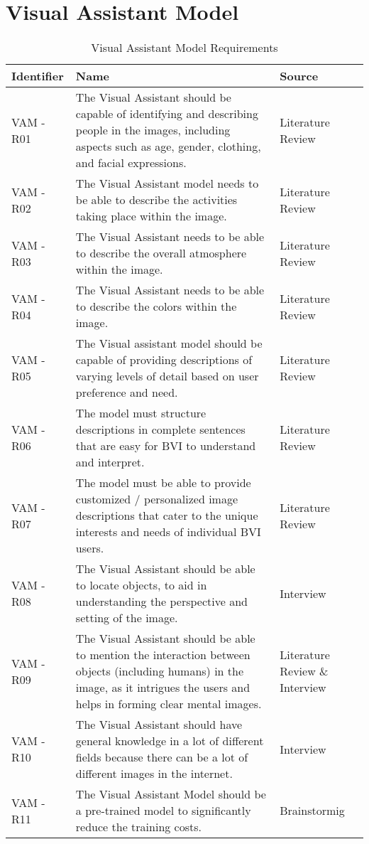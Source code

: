 \section{Visual Assistant Model}
\begin{table}[ht]
  \centering
  \caption{Visual Assistant Model Requirements}
\begin{tabularx}{\textwidth}{@{}p{2cm}p{10cm}p{3cm}@{}}
    \toprule
    \textbf{Identifier} & \textbf{Name} & \textbf{Source}\\
    \midrule

    VAM - R01 & The Visual Assistant should be capable of identifying and describing people in the images, including aspects such as age, gender, clothing, and facial expressions. & Literature Review\\
    \hline
    VAM - R02 & The Visual Assistant model needs to be able to describe the activities taking place within the image. & Literature Review\\
    \hline
    VAM - R03 & The Visual Assistant needs to be able to describe the overall atmosphere within the image. & Literature Review\\
    \hline
    VAM - R04 & The Visual Assistant needs to be able to describe the colors within the image. & Literature Review\\
    \hline
    VAM - R05 & The Visual assistant model should be capable of providing descriptions of varying levels of detail based on user preference and need. & Literature Review\\
        \hline
    VAM - R06 & The model must structure descriptions in complete sentences that are easy for BVI to understand and interpret. & Literature Review \\
    \hline
    VAM - R07 & The model must be able to provide customized / personalized image descriptions that cater to the unique interests and needs of individual BVI users. & Literature Review\\
    \hline
    VAM - R08 & The Visual Assistant should be able to locate objects, to aid in understanding the perspective and setting of the image. & Interview\\
    \hline
    VAM - R09 & The Visual Assistant should be able to mention the interaction between objects (including humans) in the image, as it intrigues the users and helps in forming clear mental images. & Literature Review \& Interview\\
    \hline
    VAM - R10 & The Visual Assistant should have general knowledge in a lot of different fields because there can be a lot of different images in the internet. & Interview\\
    \hline
    VAM - R11 & The Visual Assistant Model should be a pre-trained model to significantly reduce the training costs. & Brainstormig\\
    \hline
    
    
    \bottomrule
  \end{tabularx}
  \label{tab:requirements}
\end{table}

